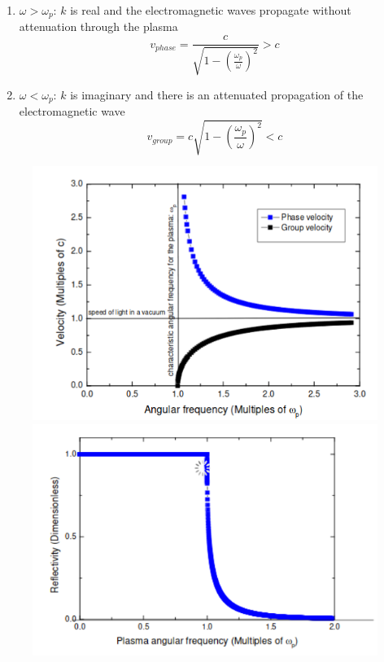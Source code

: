 \documentclass[a4paper, 11pt, normalem]{report}
\begin{document}
\begin{itemize}
\begin{enumerate}
            \item $\omega > \omega_p$: $k$ is real and the electromagnetic waves propagate without attenuation through the plasma
                \begin{equation}
                    v_{phase} = \frac{c}{\sqrt{1 - \left(\frac{\omega_p}{\omega}\right)^2}} > c
                \end{equation}
            \item $\omega < \omega_p$: $k$ is imaginary and there is an attenuated propagation of the electromagnetic wave
                \begin{equation}
                    v_{group} = c\sqrt{1 - \left(\frac{\omega_p}{\omega}\right)^2} < c
                \end{equation}
        \end{enumerate}
\end{itemize}
\begin{figure}[H]
	\centering
	\includegraphics[scale=0.4]{phasegroup.png}
	\includegraphics[scale=0.4]{plasma.png}
\end{figure}
\end{document}
